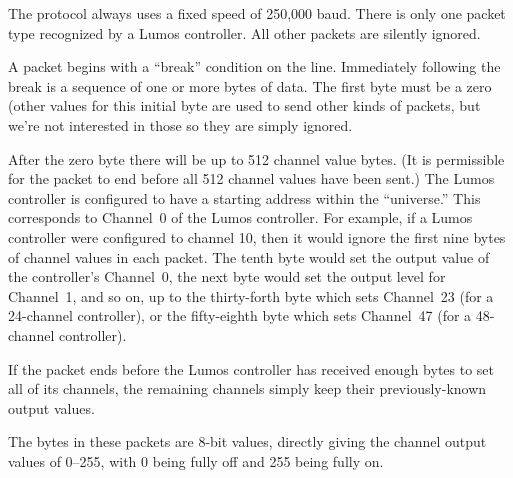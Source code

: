 \documentclass[letterpaper,twoside,onecolumn,openright,final]{memoir}
\begin{document}
The  protocol always uses a fixed speed of 250,000 baud.  There is only one packet type 
recognized by a Lumos controller.  All other packets are silently ignored.

A packet begins with a ``break'' condition on the line.  Immediately following the break is a sequence
of one or more bytes of data.  The first byte must be a zero (other values for this initial byte are used
to send other kinds of  packets, but we're not interested in those so they are simply
ignored.

After the zero byte there will be up to 512 channel value bytes.  (It is permissible for the packet to end
before all 512 channel values have been sent.)  The Lumos controller is configured to have a starting address
within the  ``universe.'' This corresponds to Channel~0 of the Lumos controller.  For example,
if a Lumos controller were configured to  channel 10, then it would ignore the first nine
bytes of channel values in each packet.  The tenth byte would set the output value of the controller's Channel~0, the next byte would set the output level for Channel~1, and so on, up to the thirty-forth byte
which sets Channel~23 (for a 24-channel controller), or the fifty-eighth byte which sets Channel~47 (for
a 48-channel controller).

If the packet ends before the Lumos controller has received enough bytes to set all of its channels,
the remaining channels simply keep their previously-known output values.

The bytes in these packets are 8-bit values, directly giving the channel output values of 0--255, with 0
being fully off and 255 being fully on.
\end{document}
